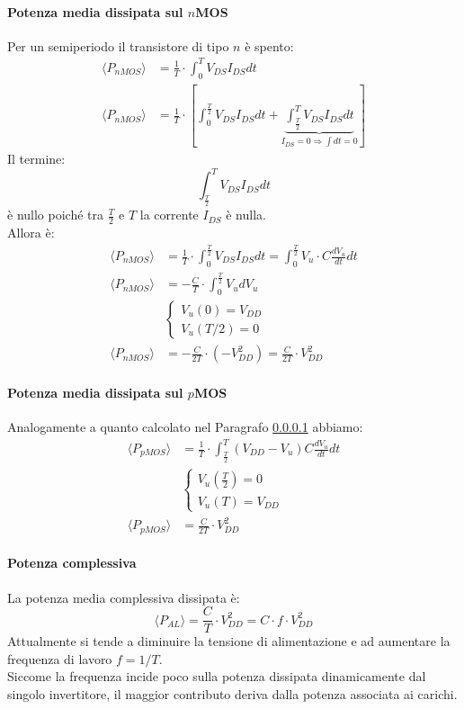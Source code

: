 \documentclass[../main.tex]{subfiles}
\begin{document}
	\paragraph{Potenza media dissipata sul $n$MOS}
	\label{par:pot-med-dis-nmos}
	Per un semiperiodo il transistore di tipo $n$ è spento:
	$$\begin{aligned} \langle P_{nMOS} \rangle &= \frac{1}{T} \cdot \int_0^T V_{DS} I_{DS} dt \\ \langle P_{nMOS} \rangle &= \frac{1}{T} \cdot \left[ \int_0^{\frac{T}{2}} V_{DS} I_{DS} dt + \underbrace{\int_{\frac{T}{2}}^T V_{DS} I_{DS} dt}_{I_{DS}=0 \Rightarrow \int dt=0} \right] \end{aligned}$$
	Il termine:
	$$\int_{\frac{T}{2}}^T V_{DS} I_{DS} dt$$
	è nullo poiché tra $\frac{T}{2}$ e $T$ la corrente $I_{DS}$ è nulla.\\
	Allora è:
	$$\begin{aligned} \langle P_{nMOS} \rangle &= \frac{1}{T} \cdot \int_0^{\frac{T}{2}} V_{DS} I_{DS} dt = \int_0^{\frac{T}{2}} V_u \cdot C \frac{dV_u}{dt} dt \\ \langle P_{nMOS} \rangle &= -\frac{C}{T} \cdot \int_0^{\frac{T}{2}} V_u dV_u \\ &\begin{cases} V_u(0) = V_{DD} \\ V_u(T/2) = 0 \end{cases} \\ \langle P_{nMOS} \rangle &= -\frac{C}{2T} \cdot (-V_{DD}^2) = \frac{C}{2T} \cdot V_{DD}^2 \end{aligned}$$
	\paragraph{Potenza media dissipata sul $p$MOS}
	Analogamente a quanto calcolato nel Paragrafo \ref{par:pot-med-dis-nmos} abbiamo:
	$$\begin{aligned} \langle P_{pMOS} \rangle &= \frac{1}{T} \cdot \int_{\frac{T}{2}}^T (V_{DD} - V_u) C \frac{dV_u}{dt} dt \\ &\begin{cases} V_u(\frac{T}{2}) = 0 \\ V_u(T) = V_{DD} \end{cases} \\ \langle P_{pMOS} \rangle &= \frac{C}{2T} \cdot V_{DD}^2 \end{aligned}$$
	\paragraph{Potenza complessiva}
	La potenza media complessiva dissipata è:
	$$\langle P_{AL} \rangle = \frac{C}{T} \cdot V_{DD}^2 = C \cdot f \cdot V_{DD}^2$$
	Attualmente si tende a diminuire la tensione di alimentazione e ad aumentare la frequenza di lavoro $f = 1/T$.\\
	Siccome la frequenza incide poco sulla potenza dissipata dinamicamente dal singolo invertitore, il maggior contributo deriva dalla potenza associata ai carichi.
\end{document}
